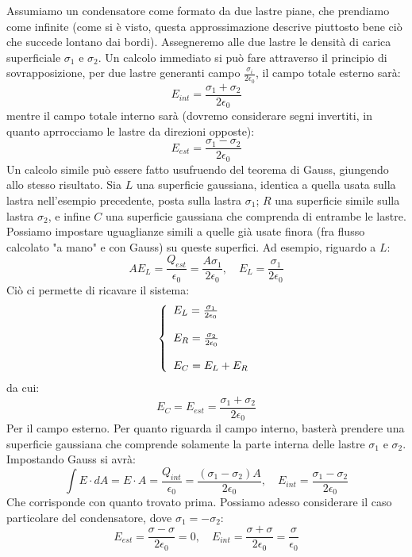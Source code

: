 \documentclass[a4paper,12pt]{article}
\begin{document}
\begin{itemize}
Assumiamo un condensatore come formato da due lastre piane, che prendiamo come infinite (come si è visto, questa approssimazione descrive piuttosto bene ciò
che succede lontano dai bordi). Assegneremo alle due lastre le densità di carica superficiale $\sigma_1$ e $\sigma_2$. Un calcolo immediato si può fare attraverso il principio di sovrapposizione,
per due lastre generanti campo $\frac{\sigma_i}{2\epsilon_0}$, il campo totale esterno sarà:
$$ E_{int} = \frac{\sigma_1 + \sigma_2}{2\epsilon_0} $$
mentre il campo totale interno sarà (dovremo considerare segni invertiti, in quanto aprrocciamo le lastre da direzioni opposte):
$$ E_{est} = \frac{\sigma_1 - \sigma_2}{2\epsilon_0} $$
Un calcolo simile può essere fatto usufruendo del teorema di Gauss, giungendo allo stesso risultato. Sia $L$ una superficie gaussiana, identica a quella usata sulla lastra
nell'esempio precedente, posta sulla lastra $\sigma_1$; $R$ una superficie simile sulla lastra $\sigma_2$, e infine $C$ una superficie gaussiana che comprenda di entrambe le lastre.
Possiamo impostare uguaglianze simili a quelle già usate finora (fra flusso calcolato "a mano" e con Gauss) su queste superfici. Ad esempio, riguardo a $L$:
$$ A E_L = \frac{Q_{est}}{\epsilon_0} = \frac{A\sigma_1}{2\epsilon_0}, \quad E_L = \frac{\sigma_1}{2\epsilon_0} $$
Ciò ci permette di ricavare il sistema:
$$ 
\left\{\begin{array}{l}
    E_L = \frac{\sigma_1}{2\epsilon_0} \cr \\
    E_R = \frac{\sigma_2}{2\epsilon_0} \cr \\ 
    E_C = E_L + E_R
\end{array}\right.
$$
da cui:
$$ E_C = E_{est} = \frac{\sigma_1 + \sigma_2}{2\epsilon_0} $$
Per il campo esterno. Per quanto riguarda il campo interno, basterà prendere una superficie gaussiana che comprende solamente la parte interna delle
lastre $\sigma_1$ e $\sigma_2$. Impostando Gauss si avrà:
$$ \int E \cdot dA = E\cdot A = \frac{Q_{int}}{\epsilon_0} = \frac{(\sigma_1 - \sigma_2)A}{2\epsilon_0}, \quad E_{int} = \frac{\sigma_1-\sigma_2}{2\epsilon_0} $$
Che corrisponde con quanto trovato prima. Possiamo adesso considerare il caso particolare del condensatore, dove $\sigma_1 = -\sigma_2$:
$$ E_{est} = \frac{\sigma - \sigma}{2\epsilon_0} = 0, \quad E_{int} = \frac{ \sigma + \sigma}{2\epsilon_0} = \frac{\sigma}{\epsilon_0} $$
\end{itemize}
\end{document}
